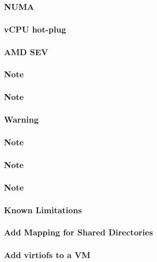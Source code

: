\subsubsection{NUMA}

\subsubsection{vCPU hot-plug}

\subsubsection{AMD SEV}

\subsubsection{Note}

\subsubsection{Note}

\subsubsection{Warning}

\subsubsection{Note}

\subsubsection{Note}

\subsubsection{Note}

\subsubsection{Known Limitations}

\subsubsection{Add Mapping for Shared Directories}

\subsubsection{Add virtiofs to a VM}

